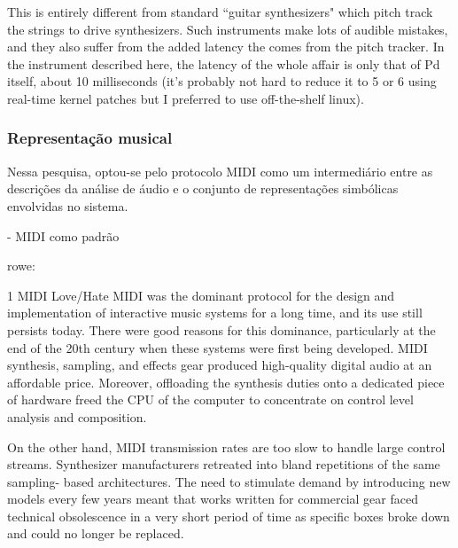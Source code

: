 \documentclass{ppgmus}
\begin{document}
This is entirely different from standard ``guitar synthesizers" which pitch track the strings to drive 
synthesizers. Such instruments make lots of audible mistakes, and they also suffer from the added latency 
the comes from the pitch tracker. In the instrument described here, the latency of the whole affair is 
only that of Pd itself, about 10 milliseconds (it's probably not hard to reduce it to 5 or 6 using 
real-time kernel patches but I preferred to use off-the-shelf linux). 





\subsubsection{Representação musical}

Nessa pesquisa, optou-se pelo protocolo MIDI como um intermediário
entre as descrições da análise de áudio e o conjunto de representações
simbólicas envolvidas no sistema.

- MIDI como padrão

rowe:

1 MIDI Love/Hate
MIDI was the dominant protocol for the
design and implementation of interactive music
systems for a long time, and its use still persists
today. There were good reasons for this
dominance, particularly at the end of the 20th
century when these systems were first being
developed. MIDI synthesis, sampling, and
effects gear produced high-quality digital audio
at an affordable price. Moreover, offloading the
synthesis duties onto a dedicated piece of
hardware freed the CPU of the computer to
concentrate on control level analysis and
composition.

On the other hand, MIDI transmission
rates are too slow to handle large control
streams. Synthesizer manufacturers retreated
into bland repetitions of the same sampling-
based architectures. The need to stimulate
demand by introducing new models every few
years meant that works written for commercial
gear faced technical obsolescence in a very short
period of time as specific boxes broke down and
could no longer be replaced.
\end{document}
